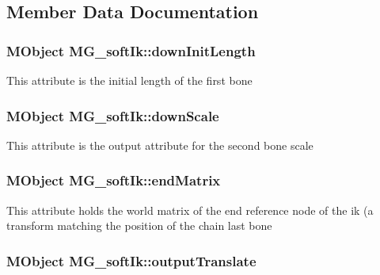\subsection{Member Data Documentation}
\hypertarget{class_m_g__soft_ik_afb62d1fde24129ba913b96afc8ec4ecc}{
\subsubsection[{down\-Init\-Length}]{\setlength{\rightskip}{0pt plus 5cm}M\-Object M\-G\-\_\-soft\-Ik\-::down\-Init\-Length\hspace{0.3cm}{\ttfamily [static]}}}\label{class_m_g__soft_ik_afb62d1fde24129ba913b96afc8ec4ecc}
This attribute is the initial length of the first bone \hypertarget{class_m_g__soft_ik_a52416d57abfb94a331943f1fa58fd53e}{
\subsubsection[{down\-Scale}]{\setlength{\rightskip}{0pt plus 5cm}M\-Object M\-G\-\_\-soft\-Ik\-::down\-Scale\hspace{0.3cm}{\ttfamily [static]}}}\label{class_m_g__soft_ik_a52416d57abfb94a331943f1fa58fd53e}
This attribute is the output attribute for the second bone scale \hypertarget{class_m_g__soft_ik_ac909738ce18e4fb5997f468c0a33cdfb}{
\subsubsection[{end\-Matrix}]{\setlength{\rightskip}{0pt plus 5cm}M\-Object M\-G\-\_\-soft\-Ik\-::end\-Matrix\hspace{0.3cm}{\ttfamily [static]}}}\label{class_m_g__soft_ik_ac909738ce18e4fb5997f468c0a33cdfb}
This attribute holds the world matrix of the end reference node of the ik (a transform matching the position of the chain last bone \hypertarget{class_m_g__soft_ik_a99464e8482fc066165a2eef1cef02027}{
\subsubsection[{output\-Translate}]{\setlength{\rightskip}{0pt plus 5cm}M\-Object M\-G\-\_\-soft\-Ik\-::output\-Translate\hspace{0.3cm}{\ttfamily [static]}}}\label{class_m_g__soft_ik_a99464e8482fc066165a2eef1cef02027}
